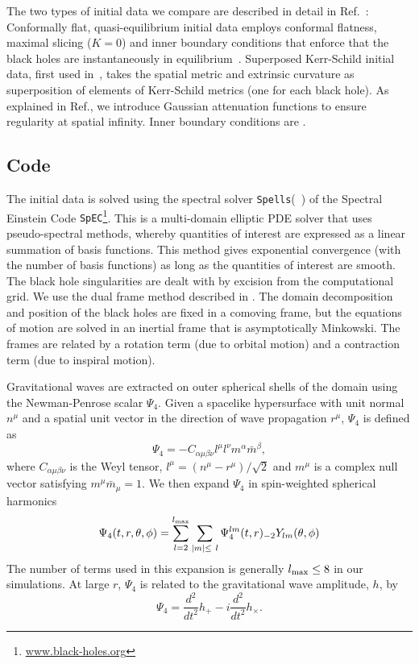 The two types of initial data we compare are described in detail in
Ref.~\cite{Lovelace2008}: Conformally flat, quasi-equilibrium initial
data employs conformal flatness, maximal slicing ($K=0$) and inner
boundary conditions that enforce that the black holes are
instantaneously in
equilibrium~\cite{Caudill-etal:2006,Cook2004,Cook2002}.  Superposed
Kerr-Schild initial data, first used
in~\cite{Marronetti-Matzner:2000,Matzner1999}, takes the spatial
metric and extrinsic curvature as superposition of elements of
Kerr-Schild metrics (one for each black hole).  As explained in
Ref.\cite{Lovelace2008}, we introduce Gaussian attenuation functions
to ensure regularity at spatial infinity.  Inner boundary conditions
are .



\subsection{Code}
\label{sec:Code}

The initial data is solved using the spectral solver {\tt Spells}(~\cite{Pfeiffer2003}) of the Spectral 
 Einstein Code {\tt SpEC}\footnote{\url{www.black-holes.org}}.  This is a
multi-domain elliptic PDE solver that uses pseudo-spectral methods,
whereby quantities of interest are expressed as a linear summation of
basis functions. This method gives exponential convergence (with the
number of basis functions) as long as the quantities of interest are
smooth. The black hole singularities are dealt with by excision from
the computational grid. We use the dual frame method described in
\cite{Scheel2006}. The domain decomposition and position of the black
holes are fixed in a comoving frame, but the equations of motion are
solved in an inertial frame that is asymptotically Minkowski. The
frames are related by a rotation term (due to orbital motion) and a
contraction term (due to inspiral motion).

Gravitational waves are extracted on outer spherical shells of the
domain using the Newman-Penrose scalar $\Psi_4$. Given a spacelike
hypersurface with unit normal $n^{\mu}$ and a spatial unit vector in
the direction of wave propagation $r^{\mu}$, $\Psi_4$ is defined as 
\begin{equation}
\Psi_4 = -C_{\alpha\mu\beta\nu}l^{\mu}l^{\nu}m^{\alpha}\bar{m}^{\beta},
\end{equation}
where $C_{\alpha\mu\beta\nu}$ is the Weyl tensor,
$l^{\mu}=\left(n^{\mu}-r^{\mu}\right)/\sqrt{2}$ and $m^{\mu}$ is a
complex null vector satisfying $m^{\mu}\bar{m}_{\mu}=1$. We then expand
$\Psi_4$ in spin-weighted spherical harmonics
\begin{equation}
\Psi_4(t,r,\theta,\phi)=\sum_{l=2}^{l_{\rm max}}\sum_{|m|\leq~l}{\Psi_4^{lm}(t,r)_{-2}Y_{lm}(\theta,\phi)}
\end{equation}
The number of terms used in this expansion is generally $l_{\rm max}\leq 8$ in
our simulations. At large $r$, $\Psi_4$ is related to the
gravitational wave amplitude, $h$, by
\begin{equation}
\Psi_4=\frac{d^2}{dt^2}h_{+}-i\frac{d^2}{dt^2}h_{\times}.
\end{equation}


